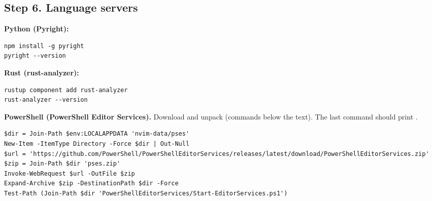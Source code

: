 \begin{paracol}{2}
\section*{Step 6. Language servers}
\textbf{Python (Pyright):}
\begin{lstlisting}
npm install -g pyright
pyright --version
\end{lstlisting}
\textbf{Rust (rust-analyzer):}
\begin{lstlisting}
rustup component add rust-analyzer
rust-analyzer --version
\end{lstlisting}
\textbf{PowerShell (PowerShell Editor Services).} Download and unpack (commands below the text). The last command should print .
\end{paracol}

\wide
\begin{lstlisting}
$dir = Join-Path $env:LOCALAPPDATA 'nvim-data/pses'
New-Item -ItemType Directory -Force $dir | Out-Null
$url = 'https://github.com/PowerShell/PowerShellEditorServices/releases/latest/download/PowerShellEditorServices.zip'
$zip = Join-Path $dir 'pses.zip'
Invoke-WebRequest $url -OutFile $zip
Expand-Archive $zip -DestinationPath $dir -Force
Test-Path (Join-Path $dir 'PowerShellEditorServices/Start-EditorServices.ps1')
\end{lstlisting}
\narrow

